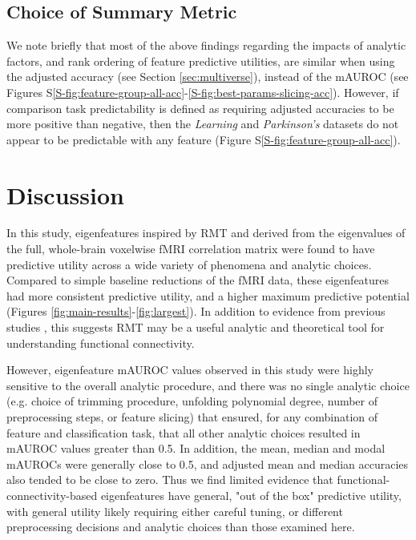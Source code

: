 \documentclass[12pt]{spieman}  %
\begin{document}
\begin{spacing}{2}
\subsection{Choice of Summary Metric}
We note briefly that most of the above findings regarding the impacts of
analytic factors, and rank ordering of feature predictive utilities, are
similar when using the adjusted accuracy (see Section \ref{sec:multiverse}),
instead of the mAUROC (see Figures
S\ref{S-fig:feature-group-all-acc}-\ref{S-fig:best-params-slicing-acc}).
However, if comparison task predictability is defined as requiring adjusted
accuracies to be more positive than negative, then the \textit{Learning} and
\textit{Parkinson's} datasets do not appear to be predictable with any feature
(Figure S\ref{S-fig:feature-group-all-acc}).


\section{Discussion}
\label{sec:discussion}

In this study, eigenfeatures inspired by RMT and derived from the eigenvalues
of the full, whole-brain voxelwise fMRI correlation matrix were found to have
predictive utility across a wide variety of phenomena and analytic choices.
Compared to simple baseline reductions of the fMRI data, these eigenfeatures
had more consistent predictive utility, and a higher maximum predictive
potential (Figures \ref{fig:main-results}-\ref{fig:largest}). In addition to
evidence from previous studies \cite{sebaRandomMatrixAnalysis2003,
wangRandomMatrixTheory2016, matharooSpontaneousBackpainAlters2020}, this
suggests RMT may be a useful analytic and theoretical tool for understanding
functional connectivity.

However, eigenfeature mAUROC values observed in this study were highly
sensitive to the overall analytic procedure, and there was no single analytic
choice (e.g. choice of trimming procedure, unfolding polynomial degree, number
of preprocessing steps, or feature slicing) that ensured, for any combination
of feature and classification task, that all other analytic choices resulted in
mAUROC values greater than 0.5. In addition, the mean, median and modal mAUROCs
were generally close to 0.5, and adjusted mean and median accuracies also
tended to be close to zero. Thus we find limited evidence that
functional-connectivity-based eigenfeatures have general, "out of the box"
predictive utility, with general utility likely requiring either careful
tuning, or different preprocessing decisions and analytic choices than those
examined here.




\end{spacing}
\end{document}
